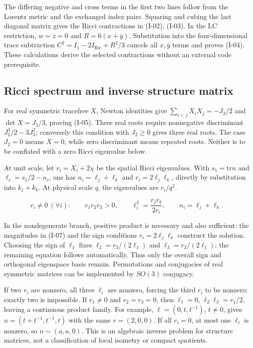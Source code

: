 The differing negative and cross terms in the first two lines follow from the Lorentz metric and the exchanged index pairs. Squaring and cubing the last diagonal matrix gives the Ricci contractions in (I-02), (I-03). In the LC restriction, $w=z=0$ and $R=6(x+\bar y)$. Substitution into the four-dimensional trace subtraction $C^2=I_1-2I_{\mathrm{Ric}}+R^2/3$ cancels all $x,\bar y$ terms and proves (I-04). These calculations derive the selected contractions without an external code prerequisite.

\subsection{Ricci spectrum and inverse structure matrix}

For real symmetric tracefree $X$, Newton identities give $\sum_{i<j}X_iX_j=-J_2/2$ and $\det X=J_3/3$, proving (I-05). Three real roots require nonnegative discriminant $J_2^3/2-3J_3^2$; conversely this condition with $J_2\ge0$ gives three real roots. The case $J_2=0$ means $X=0$, while zero discriminant means repeated roots. Neither is to be conflated with a zero Ricci eigenvalue below.

At unit scale, let $r_i=X_i+2\chi$ be the spatial Ricci eigenvalues. With $s_1=\mathrm{tr}n$ and $\ell_i=s_1/2-n_i$, one has $n_i=\ell_j+\ell_k$ and $r_i=2\ell_j\ell_k$, directly by substitution into $k_j+k_k$. At physical scale $q$, the eigenvalues are $r_i/q^2$.

\begin{equation}\tag{I-07}\label{eq:I-07}
r_i\ne0\ (\forall i):\qquad r_1r_2r_3>0,\qquad \ell_i^2=\frac{r_jr_k}{2r_i},\qquad n_i=\ell_j+\ell_k.
\end{equation}

In the nondegenerate branch, positive product is necessary and also sufficient: the magnitudes in (I-07) and the sign conditions $r_i=2\ell_j\ell_k$ construct the solution. Choosing the sign of $\ell_1$ fixes $\ell_2=r_3/(2\ell_1)$ and $\ell_3=r_2/(2\ell_1)$; the remaining equation follows automatically. Thus only the overall sign and orthogonal eigenspace basis remain. Permutations and conjugacies of real symmetric matrices can be implemented by $SO(3)$ conjugacy.

If two $r_i$ are nonzero, all three $\ell_i$ are nonzero, forcing the third $r_i$ to be nonzero: exactly two is impossible. If $r_1\ne0$ and $r_2=r_3=0$, then $\ell_1=0$, $\ell_2\ell_3=r_1/2$, leaving a continuous product family. For example, $\ell=(0,t,t^{-1})$, $t\ne0$, gives $n=(t+t^{-1},t^{-1},t)$ with the same $r=(2,0,0)$. If all $r_i=0$, at most one $\ell_i$ is nonzero, so $n\sim(a,a,0)$. This is an algebraic inverse problem for structure matrices, not a classification of local isometry or compact quotients.
